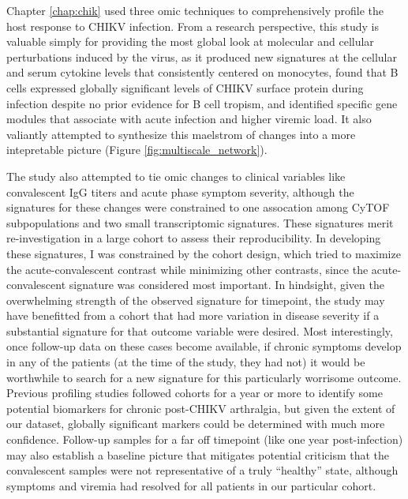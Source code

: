 Chapter \ref{chap:chik} used three omic techniques to comprehensively profile the host response to CHIKV infection. From a research perspective, this study is valuable simply for providing the most global look at molecular and cellular perturbations induced by the virus, as it produced new signatures at the cellular and serum cytokine levels that consistently centered on monocytes, found that B cells expressed globally significant levels of CHIKV surface protein during infection despite no prior evidence for B cell tropism, and identified specific gene modules that associate with acute infection and higher viremic load. It also valiantly attempted to synthesize this maelstrom of changes into a more intepretable picture (Figure \ref{fig:multiscale_network}).

The study also attempted to tie omic changes to clinical variables like convalescent IgG titers and acute phase symptom severity, although the signatures for these changes were constrained to one assocation among CyTOF subpopulations and two small transcriptomic signatures. These signatures merit re-investigation in a large cohort to assess their reproducibility. In developing these signatures, I was constrained by the cohort design, which tried to maximize the acute-convalescent contrast while minimizing other contrasts, since the acute-convalescent signature was considered most important. In hindsight, given the overwhelming strength of the observed signature for timepoint, the study may have benefitted from a cohort that had more variation in disease severity if a substantial signature for that outcome variable were desired. Most interestingly, once follow-up data on these cases become available, if chronic symptoms develop in any of the patients (at the time of the study, they had not) it would be worthwhile to search for a new signature for this particularly worrisome outcome. Previous profiling studies followed cohorts for a year or more to identify some potential biomarkers for chronic post-CHIKV arthralgia,\autocite{Poo2014,Chaaitanya2011,Hoarau2010,Schilte2013} but given the extent of our dataset, globally significant markers could be determined with much more confidence. Follow-up samples for a far off timepoint (like one year post-infection) may also establish a baseline picture that mitigates potential criticism that the convalescent samples were not representative of a truly ``healthy'' state, although symptoms and viremia had resolved for all patients in our particular cohort.

